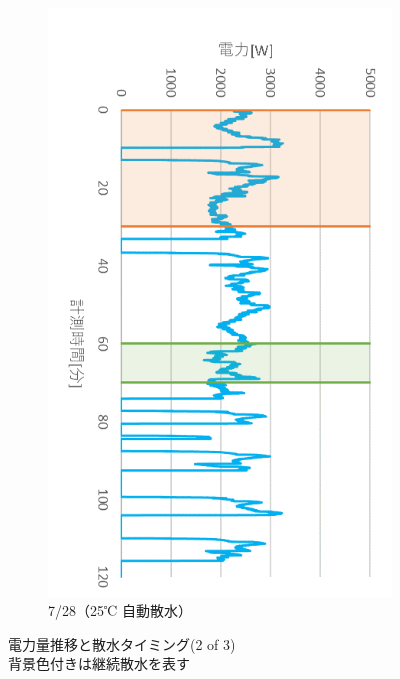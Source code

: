 \documentclass[a4j,fleqn,dvipdfmx,uplatex]{jsarticle}
\begin{document}
\begin{figure}[htb]
\begin{subfigure}[b]{0.4\hsize}
      \includegraphics[width=\linewidth]{img/t_p/20220728.png}
      \caption{7/28（25℃ 自動散水）}
  \end{subfigure}
  \caption{電力量推移と散水タイミング(2 of 3)\\背景色付きは継続散水を表す}\label{fig2:ex_outputs_2/3}
\end{figure}
\end{document}

